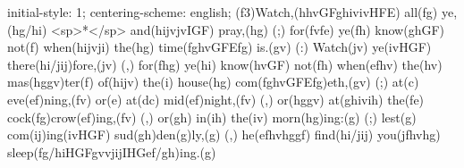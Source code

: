 initial-style: 1;
centering-scheme: english;
(f3)Watch,(hhvGFghivivHFE) all(fg) ye,(hg/hi) <sp>*</sp> and(hijvjvIGF) pray,(hg) (;) for(fvfe) ye(fh) know(ghGF) not(f) when(hijvji) the(hg) time(fghvGFEfg) is.(gv) (:)
Watch(jv) ye(ivHGF) there(hi/jij)fore,(jv) (,) for(fhg) ye(hi) know(hvGF) not(fh) when(efhv) the(hv) mas(hggv)ter(f) of(hijv) the(i) house(hg) com(fghvGFEfg)eth,(gv) (;) at(c) eve(ef)ning,(fv) or(e) at(dc) mid(ef)night,(fv) (,) or(hggv) at(ghivih) the(fe) cock(fg)crow(ef)ing,(fv) (,) or(gh) in(ih) the(iv) morn(hg)ing:(g) (;) lest(g) com(ij)ing(ivHGF) sud(gh)den(g)ly,(g) (,) he(efhvhggf) find(hi/jij) you(jfhvhg) sleep(fg/hiHGFgvvjijIHGef/gh)ing.(g)